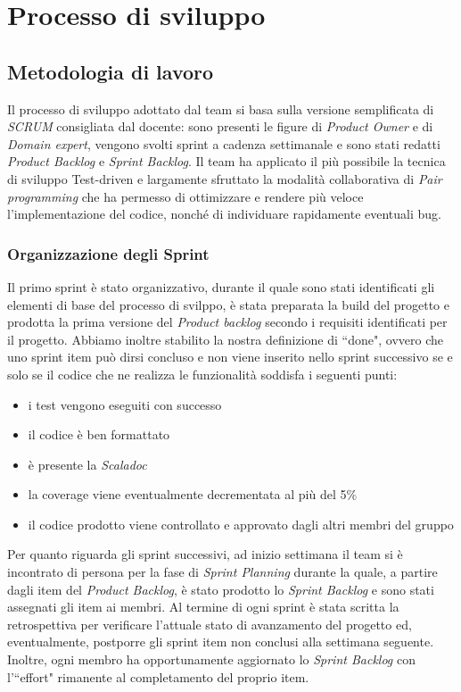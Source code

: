 \chapter{Processo di sviluppo}\label{ch:processo-di-sviluppo}
\section{Metodologia di lavoro}\label{sec:metodologia-di-lavoro}
Il processo di sviluppo adottato dal team si basa sulla versione semplificata di \textit{SCRUM} consigliata dal docente:
sono presenti le figure di \textit{Product Owner} e di \textit{Domain expert}, vengono svolti sprint a cadenza settimanale e sono stati redatti
\textit{Product Backlog} e \textit{Sprint Backlog}.
Il team ha applicato il più possibile la tecnica di sviluppo Test-driven e largamente sfruttato la modalità collaborativa di \textit{Pair programming} che ha
permesso di ottimizzare e rendere più veloce l'implementazione del codice, nonché di individuare rapidamente eventuali bug.

\subsection{Organizzazione degli Sprint}\label{subsec:organizzazione-sprint}
Il primo sprint è stato organizzativo, durante il quale sono stati identificati gli elementi di base del processo di svilppo, è stata preparata la build del progetto e prodotta la prima versione del \textit{Product backlog}
secondo i requisiti identificati per il progetto.
Abbiamo inoltre stabilito la nostra definizione di ``done", ovvero che uno sprint item può dirsi concluso e non viene inserito
nello sprint successivo se e solo se il codice che ne realizza le funzionalità soddisfa i seguenti punti:
\begin{itemize}
    \item i test vengono eseguiti con successo
    \item il codice è ben formattato
    \item è presente la \textit{Scaladoc}
    \item la coverage viene eventualmente decrementata al più del 5\%
    \item il codice prodotto viene controllato e approvato dagli altri membri del gruppo
\end{itemize}
Per quanto riguarda gli sprint successivi, ad inizio settimana il team si è incontrato di persona per la fase di \textit{Sprint Planning} durante la quale, a partire dagli item del \textit{Product Backlog}, è stato prodotto
lo \textit{Sprint Backlog} e sono stati assegnati gli item ai membri.
Al termine di ogni sprint è stata scritta la retrospettiva per verificare l'attuale stato di avanzamento del progetto ed, eventualmente,
postporre gli sprint item non conclusi alla settimana seguente.
Inoltre, ogni membro ha opportunamente aggiornato lo \textit{Sprint Backlog} con l'``effort" rimanente al completamento del proprio item.

